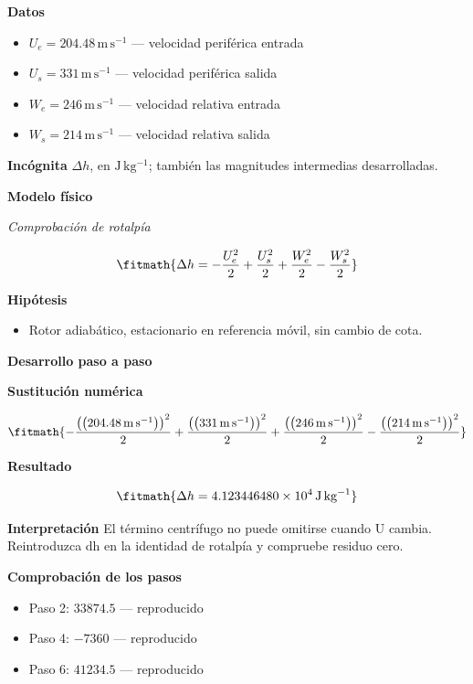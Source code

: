 \documentclass[10pt,openany]{book}
\begin{document}
\noindent\textbf{Datos}
\begin{itemize}
\item $U_e = 204.48\,\mathrm{m}\,\mathrm{s}^{-1}$ — velocidad periférica entrada
\item $U_s = 331\,\mathrm{m}\,\mathrm{s}^{-1}$ — velocidad periférica salida
\item $W_e = 246\,\mathrm{m}\,\mathrm{s}^{-1}$ — velocidad relativa entrada
\item $W_s = 214\,\mathrm{m}\,\mathrm{s}^{-1}$ — velocidad relativa salida
\end{itemize}

\noindent\textbf{Incógnita}
$\Delta h$, en $\mathrm{J\,kg^{-1}}$; también las magnitudes intermedias desarrolladas.

\noindent\textbf{Modelo físico}

\noindent\textit{Comprobación de rotalpía}

\[
\fitmath{\Delta h=- \frac{U_e^{2}}{2} + \frac{U_s^{2}}{2} + \frac{W_e^{2}}{2} - \frac{W_s^{2}}{2}}
\]

\noindent\textbf{Hipótesis}
\begin{itemize}
\item Rotor adiabático, estacionario en referencia móvil, sin cambio de cota.
\end{itemize}

\noindent\textbf{Desarrollo paso a paso}



\noindent\textbf{Sustitución numérica}

\[
\fitmath{- \frac{\left(\left(204.48\,\mathrm{m}\,\mathrm{s}^{-1}\right)\right)^{2}}{2} + \frac{\left(\left(331\,\mathrm{m}\,\mathrm{s}^{-1}\right)\right)^{2}}{2} + \frac{\left(\left(246\,\mathrm{m}\,\mathrm{s}^{-1}\right)\right)^{2}}{2} - \frac{\left(\left(214\,\mathrm{m}\,\mathrm{s}^{-1}\right)\right)^{2}}{2}}
\]

\noindent\textbf{Resultado}

\[
\fitmath{\Delta h=4.123446480\times10^{4}\,\mathrm{J}\,\mathrm{kg}^{-1}}
\]

\noindent\textbf{Interpretación}
El término centrífugo no puede omitirse cuando U cambia. Reintroduzca dh en la identidad de rotalpía y compruebe residuo cero.

\noindent\textbf{Comprobación de los pasos}
\begin{itemize}
\item Paso 2: $33874.5$ — reproducido
\item Paso 4: $-7360$ — reproducido
\item Paso 6: $41234.5$ — reproducido
\end{itemize}
\end{document}
